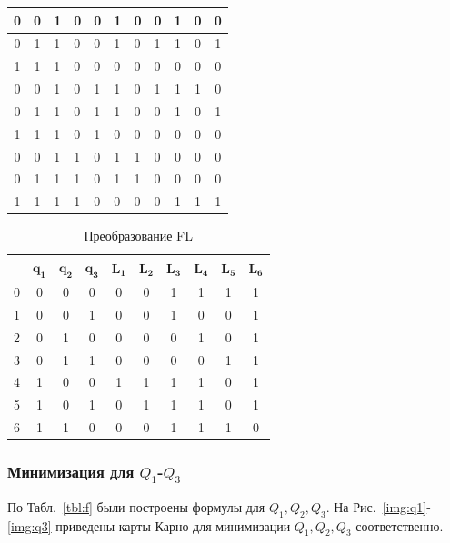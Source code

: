 \documentclass[a4paper, final]{article}
\begin{document}
\begin{table}[h!]
\begin{tabularx}{0.8\textwidth}{|c|c|X|X|X||X|X|X|c|c|c|}
  0 & 0 &   1 & 0 & 0 &  1 & 0 & 0 &  1 & 0 & 0 \\
  \hline
  0 & 1 &   1 & 0 & 0 &  1 & 0 & 1 &  1 & 0 & 1 \\
  \hline
  1 & 1 &   1 & 0 & 0 &  0 & 0 & 0 &  0 & 0 & 0 \\
  \hline

  0 & 0 &   1 & 0 & 1 &  1 & 0 & 1 &  1 & 1 & 0 \\
  \hline
  0 & 1 &   1 & 0 & 1 &  1 & 0 & 0 &  1 & 0 & 1 \\
  \hline
  1 & 1 &   1 & 0 & 1 &  0 & 0 & 0 &  0 & 0 & 0 \\
  \hline

  0 & 0 &   1 & 1 & 0 &  1 & 1 & 0 &  0 & 0 & 0 \\
  \hline
  0 & 1 &   1 & 1 & 0 &  1 & 1 & 0 &  0 & 0 & 0 \\
  \hline
  1 & 1 &   1 & 1 & 0 &  0 & 0 & 0 &  1 & 1 & 1 \\
  \hline
  \end{tabularx}
\end{table}

\begin{table}[h!]
  \centering
  \caption{Преобразование FL}
  \label{tbl:fl}
  \footnotesize
  \begin{tabular}{|c||c|c|c||c|c|c|c|c|c|}
  \hline
      & $\mathbf{q_1}$& $\mathbf{q_2}$ & $\mathbf{q_3}$ & $\mathbf{L_1}$ & $\mathbf{L_2}$ & $\mathbf{L_3}$ & $\mathbf{L_4}$ & $\mathbf{L_5}$ & $\mathbf{L_6}$ \\
  \hline
  \hline
  0   & 0 & 0 & 0   & 0 & 0 & 1 & 1 & 1 & 1 \\
  \hline
  1   & 0 & 0 & 1   & 0 & 0 & 1 & 0 & 0 & 1 \\
  \hline
  2   & 0 & 1 & 0   & 0 & 0 & 0 & 1 & 0 & 1 \\
  \hline
  3   & 0 & 1 & 1   & 0 & 0 & 0 & 0 & 1 & 1 \\
  \hline
  4   & 1 & 0 & 0   & 1 & 1 & 1 & 1 & 0 & 1 \\
  \hline
  5   & 1 & 0 & 1   & 0 & 1 & 1 & 1 & 0 & 1 \\
  \hline
  6   & 1 & 1 & 0   & 0 & 0 & 1 & 1 & 1 & 0 \\
  \hline
  \end{tabular}
\end{table}

\subsubsection{Минимизация для $Q_1$-$Q_3$}
По Табл.~\ref{tbl:f} были построены формулы для $Q_1, Q_2, Q_3$. На Рис.~\ref{img:q1}-\ref{img:q3} приведены карты Карно для минимизации $Q_1, Q_2, Q_3$ соответственно.
\end{document}
